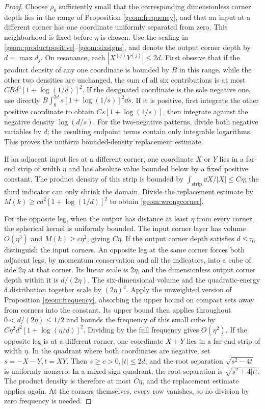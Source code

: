 \begin{proof}
Choose $\rho_0$ sufficiently small that the corresponding dimensionless
corner depth lies in the range of Proposition \ref{geom:frequency},
and that an input at a different corner has one coordinate uniformly
separated from zero. This neighborhood is fixed before $\eta$ is chosen.
Use the scaling in \eqref{geom:productpositive}--\eqref{geom:sixsigns},
and denote the output corner depth by $d=\max d_j$.
On resonance, each $|X^{(j)}Y^{(j)}|\le2d$.
First observe that if the product density of any one coordinate is bounded
by $B$ in this range, while the other two densities are unchanged, the
sum of all six contributions is at most
$CBd^2[1+\log(1/d)]^2$.
If the designated coordinate is the sole negative one, use directly
$B\int_0^{2d}s[1+\log(1/s)]^2\dd s$.
If it is positive, first integrate the other positive coordinate to obtain
$Cs[1+\log(1/s)]$, then integrate against the negative density
$\log(d/s)$.
For the two-negative patterns, divide both negative variables by $d$;
the resulting endpoint terms contain only integrable logarithms.
This proves the uniform bounded-density replacement estimate.

If an adjacent input lies at a different corner, one coordinate $X$ or
$Y$ lies in a far-end strip of width $\eta$ and has absolute value
bounded below by a fixed positive constant. The product density of this
strip is bounded by $\int_{\mathrm{strip}}\dd X/|X|\le C\eta$;
the third indicator can only shrink the domain.
Divide the replacement estimate by
$M(k)\ge cd^2[1+\log(1/d)]^2$ to obtain \eqref{geom:wrongcorner}.

For the opposite leg, when the output has distance at least $\eta$
from every corner, the spherical kernel is uniformly bounded.
The input corner layer has volume $O(\eta^3)$ and
$M(k)\ge c\eta^2$, giving $C\eta$.
If the output corner depth satisfies $d\le\eta$, distinguish the input
corners. An opposite leg at the same corner forces both adjacent legs,
by momentum conservation and all the indicators, into a cube of side
$2\eta$ at that corner. Its linear scale is $2\eta$, and the dimensionless
output corner depth within it is $d/(2\eta)$.
The six-dimensional volume and the quadratic-energy $\delta$ distribution
together scale by $(2\eta)^4$.
Apply the unweighted version of Proposition \ref{geom:frequency},
absorbing the upper bound on compact sets away from corners into the
constant. Its upper bound then applies throughout
$0<d/(2\eta)\le1/2$ and bounds the frequency of this small cube by
$C\eta^2d^2[1+\log(\eta/d)]^2$.
Dividing by the full frequency gives $O(\eta^2)$.
If the opposite leg is at a different corner, one coordinate $X+Y$
lies in a far-end strip of width $\eta$.
In the quadrant where both coordinates are negative, set
$s=-X-Y,t=XY$. Then $s\ge c>0,|t|\le2d$, and the root separation
$\sqrt{s^2-4t}$ is uniformly nonzero.
In a mixed-sign quadrant, the root separation is $\sqrt{s^2+4|t|}$.
The product density is therefore at most $C\eta$, and the replacement
estimate applies again. At the corners themselves, every row vanishes,
so no division by zero frequency is needed.
\end{proof}

